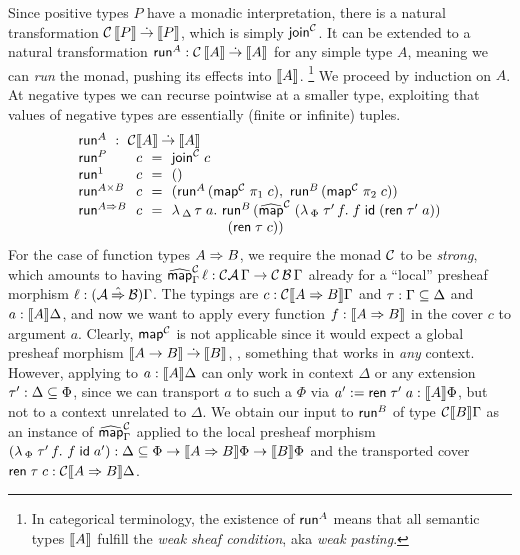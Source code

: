 \documentclass[sigplan,screen,fleqn,review]{acmart} %
\begin{document}
Since positive types $P$ have a monadic interpretation, there is a
natural transformation $\C\,\den P \todot \den P$, which is simply
$\tjoin[\C]$.  It
can be extended to a
natural transformation $\trun^A : \C\,\den A \todot \den A$ for any simple
type $A$, meaning we can \emph{run} the monad,
pushing its effects into $\den A$.%
\footnote{In categorical terminology, the existence of
$\trun^A$ means that
all semantic types $\den{A}$ fulfill the \emph{weak sheaf condition},
aka \emph{weak pasting}.}
We proceed by induction on $A$.
At negative types we can recurse pointwise at a smaller type,
exploiting that values of negative types are essentially
(finite or infinite) tuples.
\[
\begin{array}{l@{~~}l@{~~}c@{~~}l}%
  \multicolumn 4 l {\trun^A ~:~ \C \den A \todot \den A} \\
  \trun^P & c & = & \tjoin[\C]\;c \\
  \trun^{\tyone} & c & = & \ttempty
    \\
  \trun^{A \times B} & c & = &
      (\trun^A\,(\tmap[\C]\;\pi_1\;c),\
       \trun^B\,(\tmap[\C]\;\pi_2\;c))
  \\
  \trun^{A \To B} & c  & = & \lambda\,_\Delta \,\tau \; a. \ \trun^B\,
      (\stmap[\C]\;(\lambda\,_\Phi\;\tau'\,f.\;f\;\tid\;(\tren\;\tau'\;a))
  \\ &&& \qquad \qquad (\tren\;\tau\;c))
  \\
\end{array}
\]
For the case of function types $A \To B$, we require the monad $\C$ to be
\emph{strong}, which amounts to having
$\stmap[\C]_\Gamma\, \ell : \C\A\,\Gamma \to \C\,\B\,\Gamma$ already for
a ``local'' presheaf morphism $\ell : (\A \hatto \B)\Gamma$.
The typings are
$c : \C \den{A \To B} \Gamma$ and
$\tau : \Gamma \sublist \Delta$ and
$a : \den A \Delta$, and now we want to apply every function
$f : \den{A \To B}$ %
in the cover $c$ to argument $a$.  Clearly,
$\tmap[\C]$ is not applicable since it would expect a
global presheaf morphism
$\den{A \to B} \todot \den B$, \ie, something that works in \emph{any}
context.  However, applying to $a : \den A \Delta$ can only work in
context $\Delta$ or any extension $\tau' : \Delta \sublist \Phi$,
since we can transport $a$ to such a $\Phi$ via
$a' := \tren\; \tau'\; a : \den A \Phi$, but not to a context unrelated to
$\Delta$.  We obtain our input to $\trun^B$ of type $\C \den B \Gamma$
as an instance of $\stmap[\C]_\Gamma$ applied to the local presheaf morphism
$(\lambda\,_\Phi \; \tau'\, f. \  f\;\tid\;a') :
\Delta \sublist \Phi \to  \den{A \To B}\Phi \to \den B \Phi$
and the transported cover $\tren\;\tau\;c : \C\den{A \To B}\Delta$.
\end{document}
